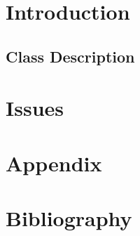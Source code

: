 \documentclass[12pt, a4paper]{article}
\title{
	\Huge{\textbf{\centerline{myTaxiService}}}
	\newline
	\huge{\textbf{C}ode \textbf{I}nspection}
}
\author{
	Monica Magoni 854091
	\\
	Alberto Cibari 852689
}
\date{\today}
\begin{document}
	\maketitle
	\newpage
	\renewcommand*\contentsname{\Huge{Contents}}
	\tableofcontents
	
	\newpage
	
    \section{Introduction}
    	
    	
    	\subsection{Class Description}
    	
    
    \newpage
    \section{Issues}
        
    
    \newpage
    \section*{Appendix}
        
    
    \newpage
    \section*{Bibliography}
        
\end{document}
